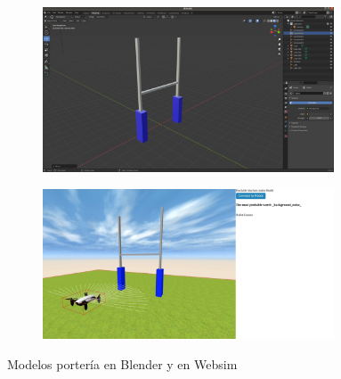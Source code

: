  \begin{figure}[H]
  \begin{subfigure}[b]{0.5\textwidth}
  \centering
    \includegraphics[width=0.95\textwidth, height=0.7\textwidth]{chapters/images/porteriablender.png}
    \caption{}
    \label{fig:f1}
  \end{subfigure}
  \hfill
  \begin{subfigure}[b]{0.5\textwidth}
  \centering
    \includegraphics[width=0.95\textwidth, height=0.7\textwidth]{chapters/images/porteriawebsim.png}
	\caption{}    
    \label{fig:f2}
 
  \end{subfigure}
  \caption{Modelos portería en Blender y  en Websim }
\end{figure}


